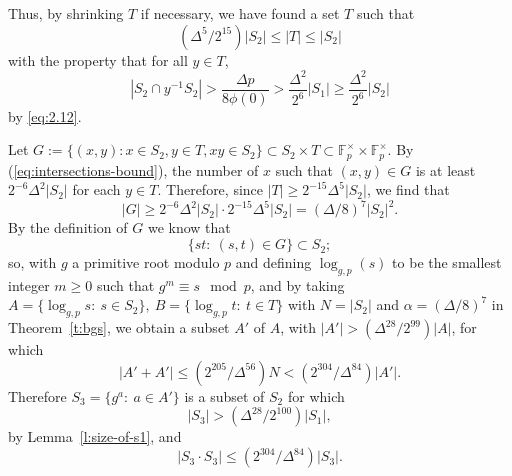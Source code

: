 \documentclass[11pt]{amsart}
\newcommand{\fp}{\mathbb{F}_p}
\begin{document}
Thus, by shrinking $T$ if necessary, we have found a set $T$ such
that
$$
 (\Delta^5/2^{15}) |S_2| \leq |T| \leq |S_2|
$$
with the property that for all $y \in T$,
\begin{equation}
  \label{eq:intersections-bound}
|S_2 \cap y^{-1}S_2| > \frac{\Delta p}{8 \phi(0)}
>\frac{ \Delta^2}{2^6} |S_1|
\geq \frac{ \Delta^2}{2^6} |S_2|
\end{equation}
by \eqref{eq:2.12}.


Let $ G := \{(x,y) : x \in S_2, y \in T, xy \in S_2 \} \subset S_2
\times T \subset \fp^\times \times \fp^\times$.  By
(\ref{eq:intersections-bound}), the number of $x$ such that $(x,y)
\in G$ is at least $2^{-6} \Delta^2 |S_2|$ for each $y \in T$.
Therefore, since $|T|\geq 2^{-15} \Delta^{5} |S_2|$, we find that
$$
|G|  \geq 2^{-6} \Delta^2 |S_2| \cdot 2^{-15} \Delta^{5} |S_2| =
(\Delta/8)^{7} |S_2|^2.
$$
By the definition of $G$ we know that
$$
\{ st: \ (s,t) \in G\} \subset S_2;
$$
so, with $g$ a primitive root modulo $p$ and defining
  $\log_{g,p}(s)$ to be the smallest integer $m \geq 0$ such that $g^m
  \equiv s \mod p$, and  by taking
$A=\{ \log_{g,p} s:\ s\in S_2\},\ B=\{ \log_{g,p} t:\ t\in T\}$ with 
$N=|S_2|$ and $\alpha=(\Delta/8)^7$ in Theorem~\ref{t:bgs}, we
obtain a subset $A'$ of $A$, with $|A'| > (\Delta^{28}/2^{99}) |A|$,
for which
$$
|A'+A'| \leq (2^{205}/\Delta^{56}) N < (2^{304}/\Delta^{84})  |A'| .
$$
Therefore $S_3 =\{ g^a:\ a\in A'\}$ is a subset of $S_2$ for which
\begin{equation}
\label{eq:s3-vs-s1-size} |S_3| > (\Delta^{28}/2^{100}) |S_1| ,
\end{equation}
by Lemma~\ref{l:size-of-s1}, and
$$
|S_3 \cdot S_3| \leq (2^{304}/\Delta^{84}) |S_3| .
$$
\end{document}
